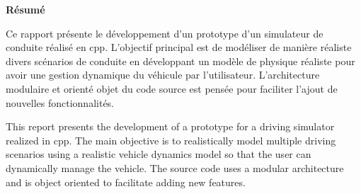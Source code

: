\documentclass[a4paper,12pt]{report}
\begin{document}
    \clearpage

    \vspace*{\fill}
    \begin{center}
    {\Large \textbf{Résumé}}
    \end{center}
    \bigskip
    \noindent
    \begin{minipage}{\textwidth}
        Ce rapport présente le développement d'un prototype d'un simulateur de conduite réalisé en \gls{cpp}.
        L'objectif principal est de modéliser de manière réaliste divers scénarios de conduite en développant un modèle de physique réaliste pour avoir une gestion dynamique du véhicule par l'utilisateur.
        L'architecture modulaire et orienté objet du code source est pensée pour faciliter l'ajout de nouvelles fonctionnalités.

        \bigskip

        This report presents the development of a prototype for a driving simulator realized in \gls{cpp}.
        The main objective is to realistically model multiple driving scenarios using a realistic vehicle dynamics model so that the user can dynamically manage the vehicle.
        The source code uses a modular architecture and is object oriented to facilitate adding new features.
    \end{minipage}
    \vspace*{\fill} %
    \clearpage
\end{document}
